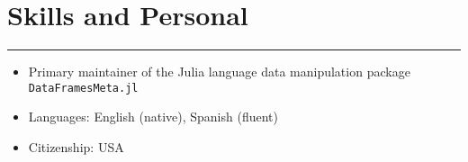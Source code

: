 \documentclass[10pt]{article}
\newenvironment{customitemize}
{ \begin{itemize}[leftmargin=\parindent, topsep = 0.2pt, itemsep = -3pt] }
{\end{itemize} }
\begin{document}
\section*{Skills and Personal}
\noindent \rule{\textwidth}{1pt} 
\begin{customitemize}
	\item Primary maintainer of the Julia language data manipulation package \texttt{DataFramesMeta.jl} 
	\item Languages: English (native), Spanish (fluent)
	\item Citizenship: USA
\end{customitemize}

\end{document}
